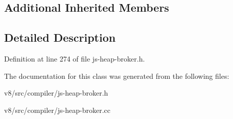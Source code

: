 \subsection*{Additional Inherited Members}


\subsection{Detailed Description}


Definition at line 274 of file js-\/heap-\/broker.\+h.



The documentation for this class was generated from the following files\+:\begin{DoxyCompactItemize}
\item 
v8/src/compiler/js-\/heap-\/broker.\+h\item 
v8/src/compiler/js-\/heap-\/broker.\+cc\end{DoxyCompactItemize}
